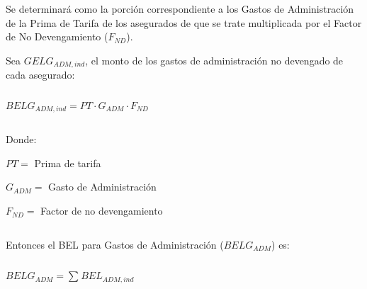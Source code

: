 \documentclass[11pt,twoside,openright,spanish]{report}
\numberwithin{equation}{chapter}
\numberwithin{figure}{chapter}
\numberwithin{table}{chapter}
\begin{document}
	 
	
	Se determinará como la porción correspondiente a los Gastos de Administración de la Prima de Tarifa de los asegurados de que se trate multiplicada por el Factor de No Devengamiento ($F_{ND}$). 
\begin{comment}
Para Salud Individual Dental, se tomara el porcentaje de gasto de administración del mercado proporcionado por la Comisión Nacional de Seguros y Fianzas.
\end{comment}	
	 
	
	Sea $GELG_{ADM,ind}$, el monto de los gastos de administración no devengado de cada asegurado:
	
	 

$ $

 

	{\centering	

\begin{comment}	
$
BELG_{ADM,ind}=\begin{cases}
PT \cdot G_{ADM} \cdot F_{ND}, & \text{$g \neq Salud  Dental  Individual$}.\\
PT \cdot \alpha_{i} \cdot F_{ND}, & \text{$g = Salud  Dental  Individual$}.
\end{cases}
$
\end{comment}


$BELG_{ADM,ind}=	PT \cdot G_{ADM} \cdot F_{ND}$




		\noindent
	
}
	

	 

$ $

 

	Donde:
	 
	
    $PT=$ Prima de tarifa
    
    $G_{ADM}^{}=$ Gasto de Administración
	
	$F_{ND}^{}=$ Factor de no devengamiento
\begin{comment}	
	$\alpha_{i}^{}=$ Porcentaje de gasto de administración con información de Mercado
\end{comment}	
	 

$ $

 

	Entonces el BEL para Gastos de Administración ($BELG_{ADM}$) es:
	
	 

$ $

 

	{\centering
	$BELG_{ADM}=\sum _{}^{}BEL_{ADM,ind}^{}$
	\noindent
	
}
	
\end{document}
